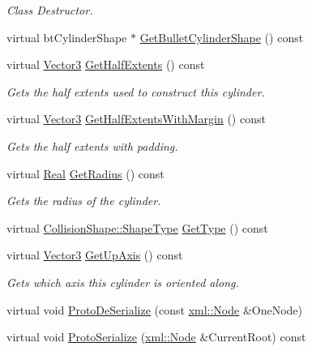 \begin{DoxyCompactItemize}
\begin{DoxyCompactList}\small\item\em Class Destructor. \item\end{DoxyCompactList}\item 
virtual btCylinderShape $\ast$ \hyperlink{classMezzanine_1_1CylinderCollisionShape_a7caaf49dfee6f543aaca4c1cf6fbf5c5}{GetBulletCylinderShape} () const 
\item 
virtual \hyperlink{classMezzanine_1_1Vector3}{Vector3} \hyperlink{classMezzanine_1_1CylinderCollisionShape_a4184b98934573f5dae1ed34578dc18c0}{GetHalfExtents} () const 
\begin{DoxyCompactList}\small\item\em Gets the half extents used to construct this cylinder. \item\end{DoxyCompactList}\item 
virtual \hyperlink{classMezzanine_1_1Vector3}{Vector3} \hyperlink{classMezzanine_1_1CylinderCollisionShape_a9b16715071eaa8827162a8ea36132a23}{GetHalfExtentsWithMargin} () const 
\begin{DoxyCompactList}\small\item\em Gets the half extents with padding. \item\end{DoxyCompactList}\item 
virtual \hyperlink{namespaceMezzanine_a726731b1a7df72bf3583e4a97282c6f6}{Real} \hyperlink{classMezzanine_1_1CylinderCollisionShape_a3f62cb0c30122784088e0f9cbbf3c798}{GetRadius} () const 
\begin{DoxyCompactList}\small\item\em Gets the radius of the cylinder. \item\end{DoxyCompactList}\item 
virtual \hyperlink{classMezzanine_1_1CollisionShape_ad04186055565998879b64176d6dd100d}{CollisionShape::ShapeType} \hyperlink{classMezzanine_1_1CylinderCollisionShape_a4feb07a9d71bda6ca4b6c82b745df8a0}{GetType} () const 
\item 
virtual \hyperlink{classMezzanine_1_1Vector3}{Vector3} \hyperlink{classMezzanine_1_1CylinderCollisionShape_a4c99a3d61ba0a4cbeb2df3d54e625541}{GetUpAxis} () const 
\begin{DoxyCompactList}\small\item\em Gets which axis this cylinder is oriented along. \item\end{DoxyCompactList}\item 
virtual void \hyperlink{classMezzanine_1_1CylinderCollisionShape_a5587a08c2cea384bef3035a9eadc09f5}{ProtoDeSerialize} (const \hyperlink{classMezzanine_1_1xml_1_1Node}{xml::Node} \&OneNode)
\item 
virtual void \hyperlink{classMezzanine_1_1CylinderCollisionShape_ae4cb206ad4761a817633af5f611e2c0b}{ProtoSerialize} (\hyperlink{classMezzanine_1_1xml_1_1Node}{xml::Node} \&CurrentRoot) const 
\end{DoxyCompactItemize}

